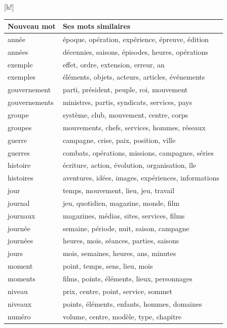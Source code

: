 \documentclass{style/these}
\makeatletter
\renewcommand\familydefault{ptm}
\newenvironment{aTable}%
  {%
   \renewcommand{\familydefault}{lmtt}\selectfont
  \@float{table}}
  {\end@float}
\makeatother
\begin{document}
\begin{part}
\begin{aTable}[h!]
\centering
\begin{tabular}{|l|l|}
\hline
\textbf{Nouveau mot} & \textbf{Ses mots similaires}			\\ \hline
année   	& époque, opération, expérience, épreuve, édition	\\ \hline
années  	& décennies, saisons, épisodes, heures, opérations	\\ \hline
exemple 	& effet, ordre, extension, erreur, an			\\ \hline
exemples 	& éléments, objets, acteurs, articles, événements	\\ \hline
gouvernement 	& parti, président, peuple, roi, mouvement		\\ \hline
gouvernements 	& ministres, partis, syndicats, services, pays		\\ \hline
groupe 		& système, club, mouvement, centre, corps		\\ \hline
groupes		& mouvements, chefs, services, hommes, réseaux		\\ \hline
guerre 		& campagne, crise, paix, position, ville		\\ \hline
guerres 	& combats, opérations, missions, campagnes, séries	\\ \hline	
histoire 	& écriture, action, évolution, organisation, île	\\ \hline
histoires 	& aventures, idées, images, expériences, informations	\\ \hline
jour 		& temps, mouvement, lieu, jeu, travail			\\ \hline
journal 	& jeu, quotidien, magazine, monde, film			\\ \hline
journaux 	& magazines, médias, sites, services, films 		\\ \hline
journée 	& semaine, période, nuit, saison, campagne		\\ \hline
journées 	& heures, mois, séances, parties, saisons		\\ \hline
jours 		& mois, semaines, heures, ans, 	minutes			\\ \hline
moment 		& point, temps, sens, lieu, mois			\\ \hline
moments		& films, points, éléments, lieux, personnages		\\ \hline
niveau 		& prix, centre, point, service, sommet			\\ \hline
niveaux 	& points, éléments, enfants, hommes, domaines		\\ \hline
numéro 		& volume, centre, modèle, type, chapitre		\\ \hline

\end{tabular}
\end{aTable}
\end{part}
\end{document}
